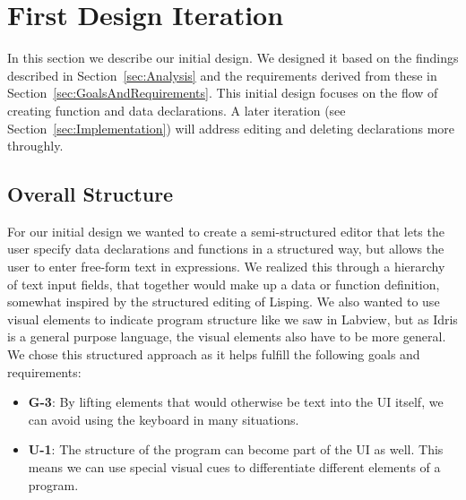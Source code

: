 \section{First Design Iteration}
\label{sec:InitialDesign}

In this section we describe our initial design. 
We designed it based on the findings described in Section~\ref{sec:Analysis} and the requirements derived from these in Section~\ref{sec:GoalsAndRequirements}.
This initial design focuses on the flow of creating function and data declarations. A later iteration (see Section~\ref{sec:Implementation}) will address editing and deleting declarations more throughly.

\subsection{Overall Structure}
For our initial design we wanted to create a semi-structured editor that lets the user specify data declarations and functions in a structured way, but allows the user to enter free-form text in expressions.
We realized this through a hierarchy of text input fields, that together would make up a data or function definition, somewhat inspired by the structured editing of Lisping.
We also wanted to use visual elements to indicate program structure like we saw in Labview, but as Idris is a general purpose language, the visual elements also have to be more general.
We chose this structured approach as it helps fulfill the following goals and requirements:
\begin{itemize}
	\item \textbf{G-3}: By lifting elements that would otherwise be text into the UI itself, we can avoid using the keyboard in many situations.
	\item \textbf{U-1}: The structure of the program can become part of the UI as well. 
	This means we can use special visual cues to differentiate different elements of a program. 
\end{itemize}


